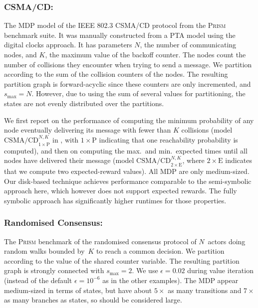 \documentclass{llncs}
\newcommand{\prism}{\textsc{Prism}\xspace}
\begin{document}
\subsubsection{CSMA/CD:}

The MDP model of the IEEE 802.3 CSMA/CD protocol from the \prism benchmark suite.
It was manually constructed from a PTA model using the digital clocks approach.
It has parameters $N$, the number of communicating nodes, and $K$, the maximum value of the backoff counter.
The nodes count the number of collisions they encounter when trying to send a message.
We partition according to the sum of the collision counters of the nodes.
The resulting partition graph is forward-acyclic since these counters are only incremented, and $s_{\max} = N$.
However, due to using the sum of several values for partitioning, the states are not evenly distributed over the partitions.

We first report on the performance of computing the minimum probability of any node eventually delivering its message with fewer than $K$ collisions (model $\text{CSMA/CD}_{1\times\text{P}}^{N\!,K}$ in , with $1\times\text{P}$ indicating that one reachability probability is computed), and then on computing the max.\ and min.\ expected times until all nodes have delivered their message (model $\text{CSMA/CD}_{2\times\text{E}}^{N\!,K}$, where $2\times\text{E}$ indicates that we compute two expected-reward values).
All MDP are only medium-sized.
Our disk-based technique achieves performance comparable to the semi-symbolic approach here, which however does not support expected rewards.
The fully symbolic approach has significantly higher runtimes for those properties.


\subsubsection{Randomised Consensus:}

The \prism benchmark of the randomised consensus protocol of $N$~actors doing random walks bounded by~$K$ to reach a common decision.
We partition according to the value of the shared counter variable.
The resulting partition graph is strongly connected with $s_{\max} = 2$.
We use $\epsilon = 0.02$ during value iteration (instead of the default $\epsilon = 10^{-6}$ as in the other examples).
The MDP appear medium-sized in terms of states, but have about $5\times$ as many transitions and $7\times$ as many branches as states, so should be considered large.
\end{document}
